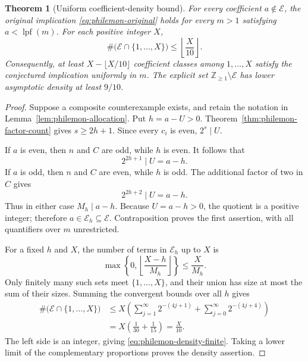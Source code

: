 \documentclass[11pt,a4paper]{article}
\newtheorem{theorem}{Theorem}[section]
\theoremstyle{definition}\newtheorem{definition}[theorem]{Definition}
\theoremstyle{remark}\newtheorem{remark}[theorem]{Remark}
\begin{document}
\begin{theorem}[Uniform coefficient-density bound]
\label{thm:philemon-density}
For every coefficient $a\notin\mathcal E$, the original implication
\eqref{eq:philemon-original} holds for every $m>1$ satisfying
$a<\operatorname{lpf}(m)$.  For each positive integer $X$,
\begin{equation}\label{eq:philemon-density-finite}
 \#\bigl(\mathcal E\cap\{1,\ldots,X\}\bigr)
 \leq\left\lfloor\frac{X}{10}\right\rfloor.
\end{equation}
Consequently, at least $X-\lfloor X/10\rfloor$ coefficient classes
among $1,\ldots,X$ satisfy the conjectured implication uniformly in
$m$.  The explicit set $\mathbb Z_{\geq1}\setminus\mathcal E$ has
lower asymptotic density at least $9/10$.
\end{theorem}

\begin{proof}
Suppose a composite counterexample exists, and retain the notation in
Lemma~\ref{lem:philemon-allocation}.  Put $h=a-U>0$.
Theorem~\ref{thm:philemon-factor-count} gives $s\geq2h+1$.
Since every $c_i$ is even, $2^s\mid U$.

If $a$ is even, then $n$ and $C$ are odd, while $h$ is even.
It follows that
\[
 2^{2h+1}\mid U=a-h.
\]
If $a$ is odd, then $n$ and $C$ are even, while $h$ is odd.
The additional factor of two in $C$ gives
\[
 2^{2h+2}\mid U=a-h.
\]
Thus in either case $M_h\mid a-h$.  Because $U=a-h>0$, the quotient
is a positive integer; therefore $a\in\mathcal E_h\subseteq
\mathcal E$.  Contraposition proves the first assertion, with all
quantifiers over $m$ unrestricted.

For a fixed $h$ and $X$, the number of terms in $\mathcal E_h$ up to
$X$ is
\[
 \max\left\{0,\left\lfloor\frac{X-h}{M_h}\right\rfloor\right\}
 \leq\frac{X}{M_h}.
\]
Only finitely many such sets meet $\{1,\ldots,X\}$, and their union
has size at most the sum of their sizes.  Summing the convergent bounds
over all $h$ gives
\begin{align*}
 \#\bigl(\mathcal E\cap\{1,\ldots,X\}\bigr)
 &\leq X\left(
     \sum_{j=1}^{\infty}2^{-(4j+1)}
     +\sum_{j=0}^{\infty}2^{-(4j+4)}\right)\\
 &=X\left(\frac1{30}+\frac1{15}\right)=\frac{X}{10}.
\end{align*}
The left side is an integer, giving
\eqref{eq:philemon-density-finite}.  Taking a lower limit of the
complementary proportions proves the density assertion.
\end{proof}
\end{document}
